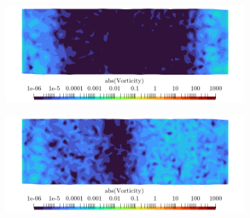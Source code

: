 \begin{figure}[t]
\centering
    \begin{subfigure}{0.49\textwidth}
    \centering
    \includegraphics[scale=0.325]{assets/graphs/double-instab.0003.png}
    \caption{}
    \label{fig:qwave1}
    \end{subfigure}
    \begin{subfigure}{0.49\textwidth}
    \centering
    \includegraphics[scale=0.325]{assets/graphs/double-instab.0004.png}
    \caption{}
    \label{fig:qwave2}
    \end{subfigure}

\vspace*{0.5em}


\end{figure}

